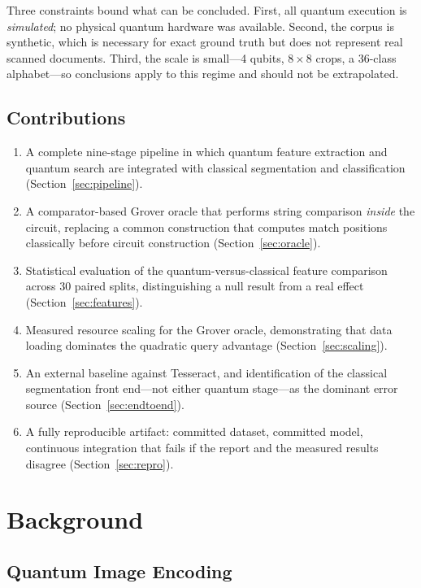 \documentclass[11pt,a4paper]{article}
\begin{document}
Three constraints bound what can be concluded. First, all quantum execution is
\emph{simulated}; no physical quantum hardware was available. Second, the corpus
is synthetic, which is necessary for exact ground truth but does not represent
real scanned documents. Third, the scale is small---4 qubits, $8\times8$ crops,
a 36-class alphabet---so conclusions apply to this regime and should not be
extrapolated.

\subsection{Contributions}

\begin{enumerate}
\item A complete nine-stage pipeline in which quantum feature extraction and
      quantum search are integrated with classical segmentation and
      classification (Section~\ref{sec:pipeline}).
\item A comparator-based Grover oracle that performs string comparison
      \emph{inside} the circuit, replacing a common construction that computes
      match positions classically before circuit construction
      (Section~\ref{sec:oracle}).
\item Statistical evaluation of the quantum-versus-classical feature comparison
      across 30 paired splits, distinguishing a null result from a real effect
      (Section~\ref{sec:features}).
\item Measured resource scaling for the Grover oracle, demonstrating that data
      loading dominates the quadratic query advantage (Section~\ref{sec:scaling}).
\item An external baseline against Tesseract, and identification of the
      classical segmentation front end---not either quantum stage---as the
      dominant error source (Section~\ref{sec:endtoend}).
\item A fully reproducible artifact: committed dataset, committed model,
      continuous integration that fails if the report and the measured results
      disagree (Section~\ref{sec:repro}).
\end{enumerate}

\section{Background}

\subsection{Quantum Image Encoding}
\end{document}
